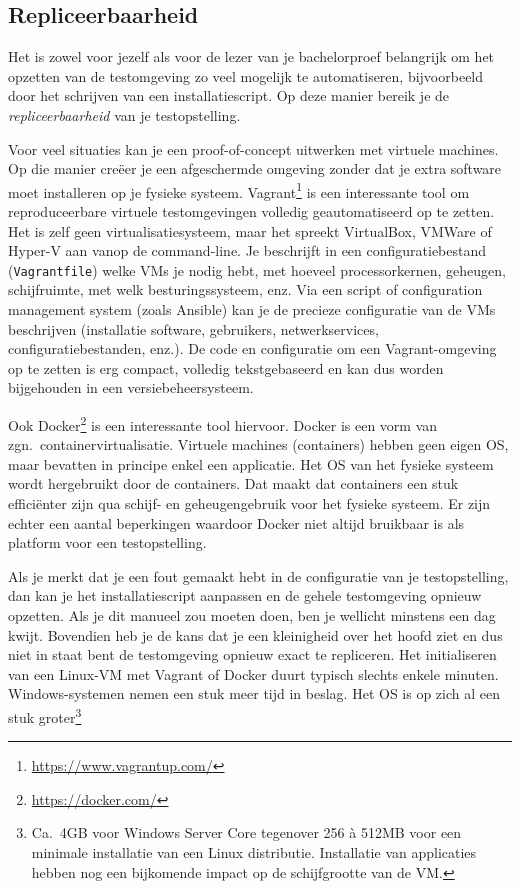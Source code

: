 \subsection{Repliceerbaarheid}%
\label{ssec:repliceerbaarheid}

Het is zowel voor jezelf als voor de lezer van je bachelorproef belangrijk om het opzetten van de testomgeving zo veel mogelijk te automatiseren, bijvoorbeeld door het schrijven van een installatiescript. Op deze manier bereik je de \textit{repliceerbaarheid} van je testopstelling.

Voor veel situaties kan je een proof-of-concept uitwerken met virtuele machines. Op die manier creëer je een afgeschermde omgeving zonder dat je extra software moet installeren op je fysieke systeem. Vagrant\footnote{\url{https://www.vagrantup.com/}} is een interessante tool om reproduceerbare virtuele testomgevingen volledig geautomatiseerd op te zetten. Het is zelf geen virtualisatiesysteem, maar het spreekt VirtualBox, VMWare of Hyper-V aan vanop de command-line. Je beschrijft in een configuratiebestand (\texttt{Vagrantfile}) welke VMs je nodig hebt, met hoeveel processorkernen, geheugen, schijfruimte, met welk besturingssysteem, enz. Via een script of configuration management system (zoals Ansible) kan je de precieze configuratie van de VMs beschrijven (installatie software, gebruikers, netwerkservices, configuratiebestanden, enz.). De code en configuratie om een Va\-grant-\-omgeving op te zetten is erg compact, volledig tekstgebaseerd en kan dus worden bijgehouden in een versiebeheersysteem.

Ook Docker\footnote{\url{https://docker.com/}} is een interessante tool hiervoor. Docker is een vorm van zgn.~containervirtualisatie. Virtuele machines (containers) hebben geen eigen OS, maar bevatten in principe enkel een applicatie. Het OS van het fysieke systeem wordt hergebruikt door de containers. Dat maakt dat containers een stuk efficiënter zijn qua schijf- en geheugengebruik voor het fysieke systeem. Er zijn echter een aantal beperkingen waardoor Docker niet altijd bruikbaar is als platform voor een testopstelling.

Als je merkt dat je een fout gemaakt hebt in de configuratie van je testopstelling, dan kan je het installatiescript aanpassen en de gehele testomgeving opnieuw opzetten. Als je dit manueel zou moeten doen, ben je wellicht minstens een dag kwijt. Bovendien heb je de kans dat je een kleinigheid over het hoofd ziet en dus niet in staat bent de testomgeving opnieuw exact te repliceren. Het initialiseren van een Linux-VM met Vagrant of Docker duurt typisch slechts enkele minuten. Windows-systemen nemen een stuk meer tijd in beslag. Het OS is op zich al een stuk groter\footnote{Ca.~4GB voor Windows Server Core tegenover 256 à 512MB voor een minimale installatie van een Linux distributie. Installatie van applicaties hebben nog een bijkomende impact op de schijfgrootte van de VM.}

